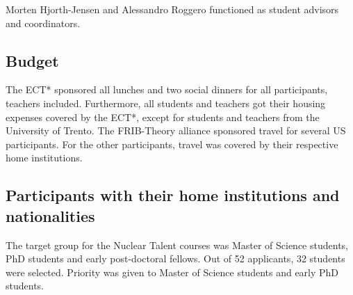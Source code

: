 \documentclass[prc,amsart,english]{revtex4-2}
\begin{document}
Morten Hjorth-Jensen and Alessandro Roggero functioned as student
advisors and coordinators.


\subsection{Budget}

The ECT* sponsored all lunches and two social dinners for all participants, teachers included. Furthermore, all students and teachers got their housing expenses covered by the ECT*, except for students and teachers from the University of Trento. The FRIB-Theory alliance sponsored travel for several US participants. For the other participants, travel was covered by their respective home institutions.


\subsection{Participants with their home institutions and nationalities}

The target group for the Nuclear Talent courses was Master of Science students, PhD students and early post-doctoral fellows.
Out of 52 applicants, 32 students were selected. Priority was given
to Master of Science students and early PhD students. 
\end{document}
